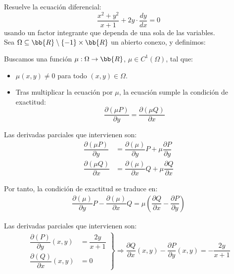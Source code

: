 \documentclass[12pt]{article}
\begin{document}
\begin{ejercicio}
    Resuelve la ecuación diferencial:
    \begin{equation*}
        \dfrac{x^2+y^2}{x+1}+2y\cdot \dfrac{dy}{dx}=0
    \end{equation*}
    usando un factor integrante que dependa de una sola de las variables.\\

    Sea $\Omega\subseteq \bb{R}\setminus \{-1\}\times \bb{R}$ un abierto conexo, y definimos:

    Buscamos una función $\mu:\Omega\to \bb{R}$, $\mu\in C^1(\Omega)$, tal que:
    \begin{itemize}
        \item $\mu(x,y)\neq 0$ para todo $(x,y)\in \Omega$.
        \item Tras multiplicar la ecuación por $\mu$, la ecuación sumple la condición de exactitud:
        \begin{equation*}
            \dfrac{\partial(\mu P)}{\partial y}=\dfrac{\partial(\mu Q)}{\partial x}
        \end{equation*}
    \end{itemize}

    Las derivadas parciales que intervienen son:
    \begin{align*}
        \dfrac{\partial(\mu P)}{\partial y}&=\dfrac{\partial(\mu)}{\partial y}P+\mu\dfrac{\partial P}{\partial y}\\
        \dfrac{\partial(\mu Q)}{\partial x}&=\dfrac{\partial(\mu)}{\partial x}Q+\mu\dfrac{\partial Q}{\partial x}
    \end{align*}

    Por tanto, la condición de exactitud se traduce en:
    \begin{align*}
        \dfrac{\partial(\mu)}{\partial y}P-\dfrac{\partial(\mu)}{\partial x}Q=\mu\left(\dfrac{\partial Q}{\partial x}-\dfrac{\partial P}{\partial y}\right)
    \end{align*}

    Las derivadas parciales que intervienen son:
    \begin{align*}
        \left.
        \begin{array}{rl}
            \dfrac{\partial(P)}{\partial y}(x,y)&=\dfrac{2y}{x+1}\\
            \dfrac{\partial(Q)}{\partial x}(x,y)&=0
        \end{array}
        \right\}
        \Longrightarrow
        \dfrac{\partial Q}{\partial x}(x,y)-\dfrac{\partial P}{\partial y}(x,y)=-\dfrac{2y}{x+1}
    \end{align*}


\end{ejercicio}
\end{document}

